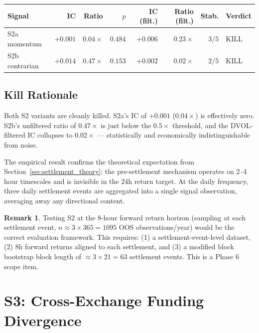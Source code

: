 \documentclass[12pt, a4paper]{article}
\theoremstyle{plain}
\theoremstyle{definition}
\newtheorem{remark}{Remark}[section]
\begin{document}
\begin{center}
\begin{tabular}{lrrrrrrl}
\toprule
Signal & IC & Ratio & $p$ & IC (filt.) & Ratio (filt.) & Stab. & Verdict \\
\midrule
S2a momentum   & $+0.001$ & $0.04\times$ & $0.484$ & $+0.006$ & $0.23\times$ & $3/5$ & KILL \\
S2b contrarian & $+0.014$ & $0.47\times$ & $0.153$ & $+0.002$ & $0.02\times$ & $2/5$ & KILL \\
\bottomrule
\end{tabular}
\end{center}

\subsection{Kill Rationale}

Both S2 variants are cleanly killed.  S2a's IC of $+0.001$ ($0.04\times$)
is effectively zero.  S2b's unfiltered ratio of $0.47\times$ is just below
the $0.5\times$ threshold, and the DVOL-filtered IC collapses to
$0.02\times$ --- statistically and economically indistinguishable from noise.

The empirical result confirms the theoretical expectation from
Section~\ref{sec:settlement_theory}: the pre-settlement mechanism
operates on 2--4 hour timescales and is invisible in the 24h return
target.  At the daily frequency, three daily settlement events are
aggregated into a single signal observation, averaging away any
directional content.

\begin{remark}
  Testing S2 at the 8-hour forward return horizon (sampling at each
  settlement event, $n \approx 3 \times 365 = 1095$ OOS observations/year)
  would be the correct evaluation framework.  This requires:
  (1) a settlement-event-level dataset, (2) 8h forward returns aligned
  to each settlement, and (3) a modified block bootstrap block length
  of $\approx 3 \times 21 = 63$ settlement events.  This is a Phase 6
  scope item.
\end{remark}

\section{S3: Cross-Exchange Funding Divergence}
\label{sec:s3}
\end{document}
